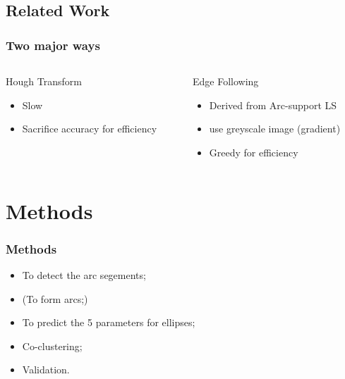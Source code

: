 \documentclass{beamer}
\begin{document}
    \subsection{Related Work}
    \begin{frame}
        \frametitle{Two major ways}
        
        

        \begin{columns}
            \begin{column}{.5\linewidth}
                Hough Transform
                \begin{itemize}
                    \item Slow
                    \item Sacrifice accuracy for efficiency
                \end{itemize}
            \end{column}
            \begin{column}{.5\linewidth}
                Edge Following
                \begin{itemize}
                    \item Derived from Arc-support LS 
                    \item use greyscale image (gradient)
                    \item Greedy for efficiency
                \end{itemize}
            \end{column}
        \end{columns}
        
    \end{frame}
    \section{Methods}
    \begin{frame}
        \frametitle{Methods}
    
        \begin{itemize}
            \item To detect the arc segements;
            \item (To form arcs;)
            \item To predict the 5 parameters for ellipses;
            \item Co-clustering;
            \item Validation.
        \end{itemize}
    
    \end{frame}
\end{document}
